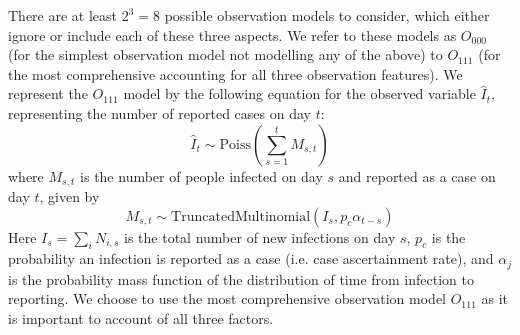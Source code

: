 \documentclass{article}
\begin{document}
\begin{enumerate}
There are at least  $2^3=8$ possible observation models to consider, which either ignore or include each of these three aspects.
We refer to these models as $O_{000}$ (for the simplest observation model not modelling any of the above) to $O_{111}$ (for the most comprehensive accounting for all three observation features). We represent the $O_{111}$ model by the following equation for the observed variable $\hat{I}_t$, representing the number of reported cases on day $t$:
\begin{equation} \label{eq:cases}
    \hat{I}_t \sim \mathrm{Poiss}\left( \sum_{s=1}^t M_{s,t}\right)
\end{equation}
where $M_{s,t}$ is the number of people infected on day $s$ and reported as a case on day $t$, given by
\begin{equation}
    M_{s,t} \sim \mathrm{TruncatedMultinomial}\left( I_s, p_c\alpha_{t-s}\right) 
\end{equation}
Here $I_s=\sum_i N_{i,s}$ is the total number of new infections on day $s$, $p_c$ is the probability an infection is reported as a case (i.e. case ascertainment rate), and $\alpha_j$ is the probability mass function of the distribution of time from infection to reporting. We choose to use the most comprehensive observation model $O_{111}$ as it is important to account of all three factors.




\end{enumerate}
\end{document}
